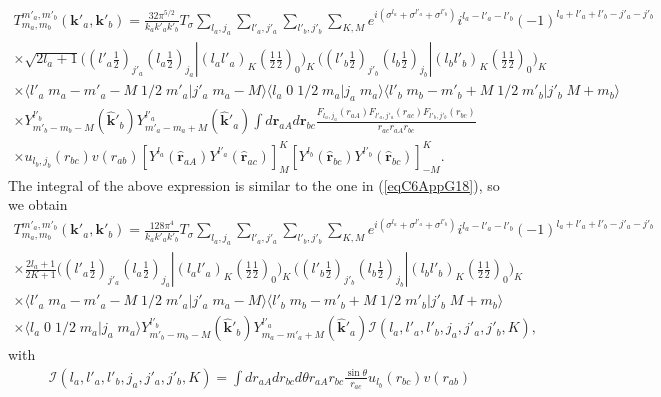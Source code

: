 \begin{subappendices}
\begin{multline}
T_{m_a,m_b}^{m'_a,m'_b}(\mathbf{k}'_a,\mathbf{k}'_b)=\frac{32\pi^{5/2}}{k_ak'_ak'_b}T_\sigma\sum_{l_a,j_a}\sum_{l'_a,j'_a}\sum_{l'_b,j'_b}\sum_{K,M}
 e^{i(\sigma^{l_a}+\sigma^{l'_a}+\sigma^{l'_b})}i^{l_a-l'_a-l'_b}(-1)^{l_a+l'_a+l'_b-j'_a-j'_b}\\
 \times \sqrt{2l_a+1}\bigl((l'_a \tfrac{1}{2})_{j'_a}(l_a \tfrac{1}{2})_{j_a}|(l_a l'_a)_K(\tfrac{1}{2} \tfrac{1}{2})_0\bigr)_K\,\bigl((l'_b \tfrac{1}{2})_{j'_b}(l_b \tfrac{1}{2})_{j_b}|(l_b l'_b)_{K}(\tfrac{1}{2} \tfrac{1}{2})_0\bigr)_{K}\\
\times \langle l'_a\;m_a-m'_a-M\;1/2\;m'_a|j'_a\;m_a-M\rangle \langle l_a\;0\;1/2\;m_a|j_a\;m_a\rangle\langle l'_b\;m_b-m'_b+M\;1/2\;m'_b|j'_b\;M+m_b\rangle\\
\times Y^{l'_b}_{m'_b-m_b-M} (\hat {\mathbf{k}}'_b)Y^{l'_a}_{m'_a-m_a+M} (\hat {\mathbf{k}}'_a)
\int d\mathbf{r}_{aA}d \mathbf{r}_{bc}\frac{F_{l_a,j_a}(r_{aA})  F_{l'_a,j'_a}(r_{ac})F_{l'_b,j'_b}(r_{bc})}{r_{ac}r_{aA}r_{bc}}\\
\times u_{l_b,j_b}(r_{bc})v(r_{ab})\left[ Y^{l_a} (\hat{\mathbf r}_{aA}) Y^{l'_a} (\hat{ \mathbf r}_{ac})\right]^K_M   \left[ Y^{l_b} (\hat{\mathbf r}_{bc}) Y^{l'_b} (\hat{\mathbf r}_{bc})\right]^{K}_{-M}.
\end{multline}
The integral of the above expression is similar to the one in (\ref{eqC6AppG18}), so we obtain
\begin{multline}\label{eqC6AppG43}
T_{m_a,m_b}^{m'_a,m'_b}(\mathbf{k}'_a,\mathbf{k}'_b)=\frac{128\pi^{4}}{k_ak'_ak'_b}T_\sigma\sum_{l_a,j_a}\sum_{l'_a,j'_a}\sum_{l'_b,j'_b}\sum_{K,M}
 e^{i(\sigma^{l_a}+\sigma^{l'_a}+\sigma^{l'_b})}i^{l_a-l'_a-l'_b}(-1)^{l_a+l'_a+l'_b-j'_a-j'_b}\\
 \times \frac{2l_a+1}{2K+1}\bigl((l'_a \tfrac{1}{2})_{j'_a}(l_a \tfrac{1}{2})_{j_a}|(l_a l'_a)_K(\tfrac{1}{2} \tfrac{1}{2})_0\bigr)_K\,\bigl((l'_b \tfrac{1}{2})_{j'_b}(l_b \tfrac{1}{2})_{j_b}|(l_b l'_b)_{K}(\tfrac{1}{2} \tfrac{1}{2})_0\bigr)_{K}\\
\times \langle l'_a\;m_a-m'_a-M\;1/2\;m'_a|j'_a\;m_a-M\rangle \langle l'_b\;m_b-m'_b+M\;1/2\;m'_b|j'_b\;M+m_b\rangle\\
\times \langle l_a\;0\;1/2\;m_a|j_a\;m_a\rangle Y^{l'_b}_{m'_b-m_b-M} (\hat {\mathbf{k}}'_b)Y^{l'_a}_{m_a-m'_a+M} (\hat {\mathbf{k}}'_a)
\mathcal I(l_a,l'_a,l'_b,j_a,j'_a,j'_b,K),
\end{multline}
with
\begin{multline}\label{eqC6AppG44}
\mathcal I(l_a,l'_a,l'_b,j_a,j'_a,j'_b,K)=\int dr_{aA} dr_{bc}d\theta r_{aA}r_{bc} \frac{\sin \theta}{r_{ac}} u_{l_b}(r_{bc})v(r_{ab})\\

\end{multline}
\end{subappendices}

